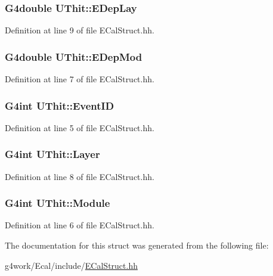 \hypertarget{struct_u_thit_a48d071a926fa1521ee2cebcbc43bc1d0}{
\subsubsection[{E\-Dep\-Lay}]{\setlength{\rightskip}{0pt plus 5cm}G4double U\-Thit\-::\-E\-Dep\-Lay}}\label{struct_u_thit_a48d071a926fa1521ee2cebcbc43bc1d0}


Definition at line 9 of file E\-Cal\-Struct.\-hh.

\hypertarget{struct_u_thit_a385c0de02872d9873961439a6b7c0c50}{
\subsubsection[{E\-Dep\-Mod}]{\setlength{\rightskip}{0pt plus 5cm}G4double U\-Thit\-::\-E\-Dep\-Mod}}\label{struct_u_thit_a385c0de02872d9873961439a6b7c0c50}


Definition at line 7 of file E\-Cal\-Struct.\-hh.

\hypertarget{struct_u_thit_a501961d563d8d0d27131c2ea0aef89b3}{
\subsubsection[{Event\-I\-D}]{\setlength{\rightskip}{0pt plus 5cm}G4int U\-Thit\-::\-Event\-I\-D}}\label{struct_u_thit_a501961d563d8d0d27131c2ea0aef89b3}


Definition at line 5 of file E\-Cal\-Struct.\-hh.

\hypertarget{struct_u_thit_a01c340c7ba48d78aaf6ef49bc88c0f6e}{
\subsubsection[{Layer}]{\setlength{\rightskip}{0pt plus 5cm}G4int U\-Thit\-::\-Layer}}\label{struct_u_thit_a01c340c7ba48d78aaf6ef49bc88c0f6e}


Definition at line 8 of file E\-Cal\-Struct.\-hh.

\hypertarget{struct_u_thit_a3e27114c436828b83cab57a70ee88ccf}{
\subsubsection[{Module}]{\setlength{\rightskip}{0pt plus 5cm}G4int U\-Thit\-::\-Module}}\label{struct_u_thit_a3e27114c436828b83cab57a70ee88ccf}


Definition at line 6 of file E\-Cal\-Struct.\-hh.



The documentation for this struct was generated from the following file\-:\begin{DoxyCompactItemize}
\item 
g4work/\-Ecal/include/\hyperlink{_e_cal_struct_8hh}{E\-Cal\-Struct.\-hh}\end{DoxyCompactItemize}
